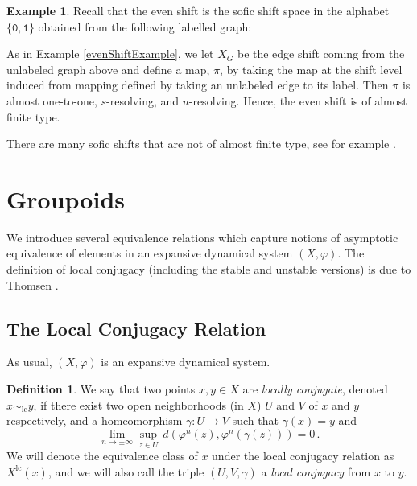 \documentclass{amsart}
\renewcommand{\S}{\mathscr{S}}
\newcommand{\word}[1]{\mathtt{#1}}
\newcommand{\lc}{\text{lc}}
\theoremstyle{plain}
\theoremstyle{definition}
\newtheorem{definition}[theorem]{Definition}
\newtheorem{example}[theorem]{Example}
\theoremstyle{remark}
\begin{document}
\begin{example}
Recall that the even shift is the sofic shift space in the alphabet $\{\word{0}, \word{1}\}$ obtained from the following labelled graph: 

\vspace{1em}
\begin{center}
\end{center}
As in Example \ref{evenShiftExample}, we let $X_G$ be the edge shift coming from the unlabeled graph above and define a map, $\pi$, by taking the map at the shift level induced from mapping defined by taking an unlabeled edge to its label. Then $\pi$ is almost one-to-one, $s$-resolving, and $u$-resolving. Hence, the even shift is of almost finite type.

There are many sofic shifts that are not of almost finite type, see for example \cite[Section 13.1]{lindmarcus}.
\end{example}


\section{Groupoids} \label{SecGroupoid}

We introduce several equivalence relations which capture notions of asymptotic equivalence of elements in an expansive dynamical system $(X,\varphi)$.  The definition of local conjugacy (including the stable and unstable versions) is due to Thomsen \cite{thomsen2010c}.
\subsection{The Local Conjugacy Relation}

As usual, $(X,\varphi)$ is an expansive dynamical system.
\begin{definition}
We say that two points $x,y \in X$ are \emph{locally conjugate}, denoted $x \sim_\lc y$, if there exist two open neighborhoods (in $X$) $U$ and $V$ of $x$ and $y$ respectively, and a homeomorphism $\gamma : U \to V$ such that $\gamma(x) = y$ and \[ \lim_{n \to \pm \infty} \sup_{z \in U} \, d(\varphi^n(z), \varphi^n(\gamma(z))) = 0 \,. \]
We will denote the equivalence class of $x$ under the local conjugacy relation as $X^\lc(x)$, and we will also call the triple $(U,V,\gamma)$ a \emph{local conjugacy} from $x$ to $y$.
\end{definition}
\end{document}

